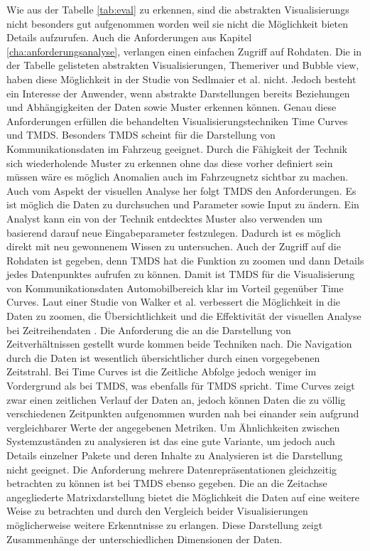 \documentclass[draft=false
              ,paper=a4
              ,twoside=false
              ,fontsize=11pt
              ,headsepline
              ,BCOR10mm
              ,DIV11
              ]{scrbook}
\begin{document}
Wie aus der Tabelle \ref{tab:eval} zu erkennen, sind die abstrakten Visualisierungs nicht besonders gut aufgenommen worden weil sie nicht die Möglichkeit bieten Details aufzurufen. Auch die Anforderungen aus Kapitel \ref{cha:anforderungsanalyse}, verlangen einen einfachen Zugriff auf Rohdaten. Die in der Tabelle gelisteten abstrakten Visualisierungen, Themeriver und Bubble view, haben diese Möglichkeit in der Studie von Sedlmaier et al. \cite{sedlmair2009} nicht. Jedoch besteht ein Interesse der Anwender, wenn abstrakte Darstellungen bereits Beziehungen und Abhängigkeiten der Daten sowie Muster erkennen können. Genau diese Anforderungen erfüllen die behandelten Visualisierungstechniken Time Curves und TMDS. Besonders TMDS scheint für die Darstellung von Kommunikationsdaten im Fahrzeug geeignet. Durch die Fähigkeit der Technik sich wiederholende Muster zu erkennen ohne das diese vorher definiert sein müssen wäre es möglich Anomalien auch im Fahrzeugnetz sichtbar zu machen. Auch vom Aspekt der visuellen Analyse her folgt TMDS den Anforderungen. Es ist möglich die Daten zu durchsuchen und Parameter sowie Input zu ändern. Ein Analyst kann ein von der Technik entdecktes Muster also verwenden um basierend darauf neue Eingabeparameter festzulegen. Dadurch ist es möglich direkt mit neu gewonnenem Wissen zu untersuchen. Auch der Zugriff auf die Rohdaten ist gegeben, denn TMDS hat die Funktion zu zoomen und dann Details jedes Datenpunktes aufrufen zu können. Damit ist TMDS für die Visualisierung von Kommunikationsdaten Automobilbereich klar im Vorteil gegenüber Time Curves. Laut einer Studie von Walker et al. verbessert die Möglichkeit in die Daten zu zoomen, die Übersichtlichkeit und die Effektivität der visuellen Analyse bei Zeitreihendaten \cite{walker_timenotes:_2016}. Die Anforderung die an die Darstellung von Zeitverhältnissen gestellt wurde kommen beide Techniken nach. Die Navigation durch die Daten ist wesentlich übersichtlicher durch einen vorgegebenen Zeitstrahl. Bei Time Curves ist die Zeitliche Abfolge jedoch weniger im Vordergrund als bei TMDS, was ebenfalls für TMDS spricht. Time Curves zeigt zwar einen zeitlichen Verlauf der Daten an, jedoch können Daten die zu völlig verschiedenen Zeitpunkten aufgenommen wurden nah bei einander sein aufgrund vergleichbarer Werte der angegebenen Metriken. Um Ähnlichkeiten zwischen Systemzuständen zu analysieren ist das eine gute Variante, um jedoch auch Details einzelner Pakete und deren Inhalte zu Analysieren ist die Darstellung nicht geeignet. Die Anforderung mehrere Datenrepräsentationen gleichzeitig betrachten zu können ist bei TMDS ebenso gegeben. Die an die Zeitachse angegliederte Matrixdarstellung bietet die Möglichkeit die Daten auf eine weitere Weise zu betrachten und durch den Vergleich beider Visualisierungen möglicherweise weitere Erkenntnisse zu erlangen. Diese Darstellung zeigt Zusammenhänge der unterschiedlichen Dimensionen der Daten.
\end{document}

